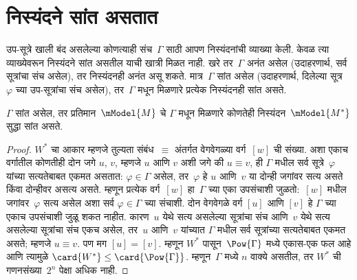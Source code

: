 











\section{निस्यंदने सांत असतात}\label{nml:fil:fin:sec}

उप-सूत्रे खाली बंद असलेल्या कोणत्याही संच~$\Gamma$
साठी आपण निस्यंदनांची व्याख्या केली. केवळ त्या
व्याख्येवरून निस्यंदने सांत असतील याची खात्री मिळत नाही.
खरे तर~$\Gamma$ अनंत असेल (उदाहरणार्थ, सर्व
सूत्रांचा संच असेल), तर निस्यंदनही अनंत असू शकते.
मात्र~$\Gamma$ सांत असेल (उदाहरणार्थ, दिलेल्या
सूत्र~$\varphi$ च्या उप-सूत्रांचा संच असेल),
तर~$\Gamma$ मधून मिळणारे प्रत्येक निस्यंदनही सांत असते.

\begin{prop}\label{nml:fil:fin:prop:filt-are-finite}
  $\Gamma$ सांत असेल, तर प्रतिमान~$\mModel{M}$ चे
  $\Gamma$ मधून मिळणारे कोणतेही निस्यंदन~$\mModel{M^*}$
  सुद्धा सांत असते.
\end{prop}

\begin{proof}
  $W^*$ चा आकार म्हणजे तुल्यता संबंध~$\equiv$ अंतर्गत
  वेगवेगळ्या वर्ग~$[w]$ ची संख्या. अशा एकाच वर्गातील
  कोणतीही दोन जगे $u$, $v$, म्हणजे $u$ आणि $v$
  अशी जगे की $u \equiv v$, ही $\Gamma$ मधील सर्व सूत्रे~$\varphi$
  यांच्या सत्यतेबाबत एकमत असतात: $\varphi \in \Gamma$ असेल,
  तर~$\varphi$ हे $u$ आणि~$v$ या दोन्ही जगांवर सत्य असते
  किंवा दोन्हीवर असत्य असते. म्हणून प्रत्येक वर्ग~$[w]$
  हा~$\Gamma$ च्या एका उपसंचाशी जुळतो:~$[w]$ मधील
  जगांवर~$\varphi$ सत्य असेल अशा सर्व $\varphi \in \Gamma$ च्या संचाशी.
  दोन वेगवेगळे वर्ग $[u]$ आणि $[v]$ हे $\Gamma$ च्या
  एकाच उपसंचाशी जुळू शकत नाहीत. कारण~$u$ येथे सत्य
  असलेल्या सूत्रांचा संच आणि~$v$ येथे सत्य असलेल्या
  सूत्रांचा संच एकच असेल, तर~$u$ आणि~$v$ यांच्यात
  $\Gamma$ मधील सर्व सूत्रांच्या सत्यतेबाबत एकमत असते;
  म्हणजे $u \equiv v$. पण मग $[u] = [v]$.
  म्हणून $W^*$ पासून~$\Pow{\Gamma}$ मध्ये एकास-एक
  फल आहे आणि त्यामुळे $\card{W^*} \le \card{\Pow{\Gamma}}$.
  म्हणून~$\Gamma$ मध्ये $n$ वाक्ये असतील, तर
  $W^*$ ची गणनसंख्या~$2^n$ पेक्षा अधिक नाही.
\end{proof}













